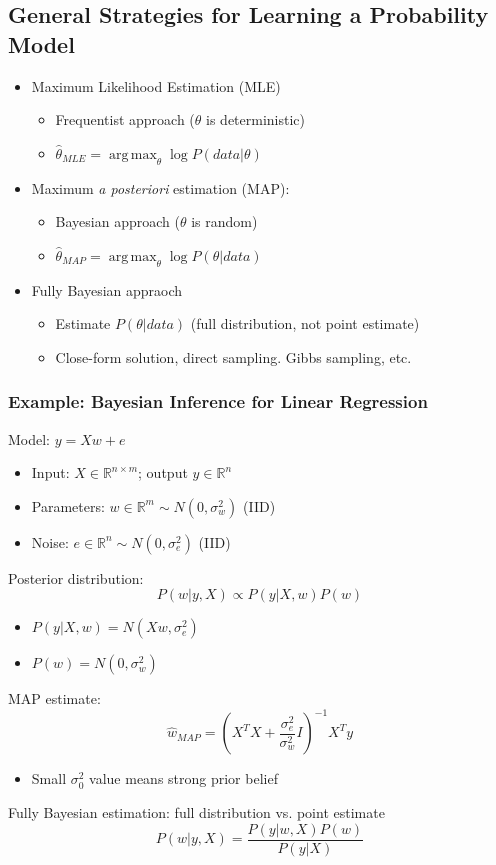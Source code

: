 \documentclass[10pt]{article}
\DeclareMathOperator*{\argmax}{arg\,max}
\begin{document}
\subsection*{General Strategies for Learning a Probability Model}
\begin{itemize}
	\item Maximum Likelihood Estimation (MLE)
	\begin{itemize}
	    \item Frequentist approach ($\theta$ is deterministic)
	    \item $\hat{\theta}_{MLE} = \argmax_\theta \log P(data | \theta)$
    \end{itemize}
    \item Maximum \textit{a posteriori} estimation (MAP):
    \begin{itemize}
	    \item Bayesian approach ($\theta$ is random)
	    \item $\hat{\theta}_{MAP} = \argmax_\theta \log P(\theta | data)$
    \end{itemize}
    \item Fully Bayesian appraoch
    \begin{itemize}
	    \item Estimate $P(\theta | data)$ (full distribution, not point estimate)
	    \item Close-form solution, direct sampling.  Gibbs sampling, etc.
    \end{itemize}
\end{itemize}

\subsubsection*{Example: Bayesian Inference for Linear Regression}
Model: $y = Xw + e$
\begin{itemize}
	\item Input: $X \in \mathbb{R}^{n \times m}$; output $y \in \mathbb{R}^n$
	\item Parameters: $w \in \mathbb{R}^m \sim N(0, \sigma_w^2)$ (IID)
	\item Noise: $e \in \mathbb{R}^n \sim N(0, \sigma_e^2)$ (IID)
\end{itemize}
Posterior distribution:
\[P(w | y, X) \propto P(y | X, w) P(w)\]
\begin{itemize}
	\item $P(y | X, w) = N(Xw, \sigma_e^2)$
	\item $P(w) = N(0, \sigma_w^2)$
\end{itemize}
MAP estimate:
\[\hat{w}_{MAP} = \left(X^T X + \frac{\sigma_e^2}{\sigma_w^2} I\right)^{-1} X^T y\]
\begin{itemize}
	\item Small $\sigma_0^2$ value means strong prior belief
\end{itemize}
Fully Bayesian estimation: full distribution vs. point estimate
\[P(w | y, X) = \frac{P(y | w, X) P(w)}{P(y | X)}\]
\end{document}
